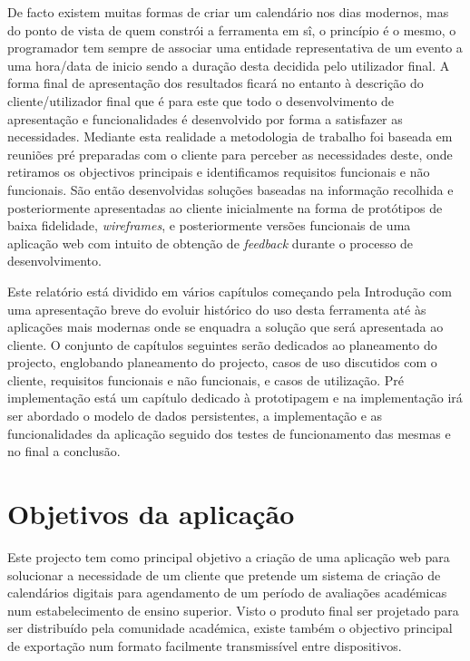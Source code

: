 \documentclass[11pt, twoside]{report}
\begin{document}
	De facto existem muitas formas de criar um calendário nos dias modernos, mas do ponto de vista de quem constrói a ferramenta em sî, o princípio é o mesmo, o programador tem sempre de associar uma entidade representativa de um evento a uma hora/data de inicio sendo a duração desta decidida pelo utilizador final. 
	A forma final de apresentação dos resultados ficará no entanto à descrição do cliente/utilizador final que é para este que todo o desenvolvimento de apresentação e funcionalidades é desenvolvido por forma a satisfazer as necessidades.
	Mediante esta realidade a metodologia de trabalho foi baseada em reuniões pré preparadas com o cliente para perceber as necessidades deste, onde retiramos os objectivos principais e identificamos requisitos funcionais e não funcionais.
	São então desenvolvidas soluções baseadas na informação recolhida e posteriormente apresentadas ao cliente inicialmente na forma de protótipos de baixa fidelidade, \textit{wireframes}, e posteriormente versões funcionais de uma aplicação web com intuito de obtenção de \textit{feedback} durante o processo de desenvolvimento.
	
	Este relatório está dividido em vários capítulos começando pela Introdução com uma apresentação breve do evoluir histórico do uso desta ferramenta até às aplicações mais modernas onde se enquadra a solução que será apresentada ao cliente.
	O conjunto de capítulos seguintes serão dedicados ao planeamento do projecto, englobando planeamento do projecto, casos de uso discutidos com o cliente, requisitos funcionais e não funcionais, e casos de utilização.
	Pré implementação está um capítulo dedicado à prototipagem e na implementação irá ser abordado  o modelo de dados persistentes, a implementação e as funcionalidades da aplicação seguido dos testes de funcionamento das mesmas e no final a conclusão.
	
	\section{Objetivos da aplicação}
	
	Este projecto tem como principal objetivo a criação de uma aplicação web para solucionar a necessidade de um cliente que pretende um sistema de criação de calendários digitais para agendamento de um período de avaliações académicas num estabelecimento de ensino superior. 
	Visto o produto final ser projetado para ser distribuído pela comunidade académica, existe também o objectivo principal de exportação num formato facilmente transmissível entre dispositivos.  
	
\end{document}
